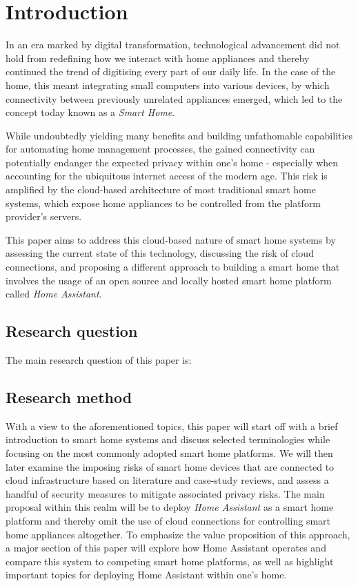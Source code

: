 

\section{Introduction}

In an era marked by digital transformation, technological advancement did not hold from redefining how we interact with home appliances and thereby continued the trend of digitising every part of our daily life. In the case of the home, this meant integrating small computers into various devices, by which connectivity between previously unrelated appliances emerged, which led to the concept today known as a \textit{Smart Home}.

While undoubtedly yielding many benefits and building unfathomable capabilities for automating home management processes, the gained connectivity can potentially endanger the expected privacy within one's home - especially when accounting for the ubiquitous internet access of the modern age. This risk is amplified by the cloud-based architecture of most traditional smart home systems, which expose home appliances to be controlled from the platform provider's servers. 

This paper aims to address this cloud-based nature of smart home systems by assessing the current state of this technology, discussing the risk of cloud connections, and proposing a different approach to building a smart home that involves the usage of an open source and locally hosted smart home platform called \textit{Home Assistant}.


\subsection{Research question}
The main research question of this paper is:


\subsection{Research method}
With a view to the aforementioned topics, this paper will start off with a brief introduction to smart home systems and discuss selected terminologies while focusing on the most commonly adopted smart home platforms. We will then later examine the imposing risks of smart home devices that are connected to cloud infrastructure based on literature and case-study reviews, and assess a handful of security measures to mitigate associated privacy risks. The main proposal within this realm will be to deploy \textit{Home Assistant} as a smart home platform and thereby omit the use of cloud connections for controlling smart home appliances altogether. To emphasize the value proposition of this approach, a major section of this paper will explore how Home Assistant operates and compare this system to competing smart home platforms, as well as highlight important topics for deploying Home Assistant within one's home. 

